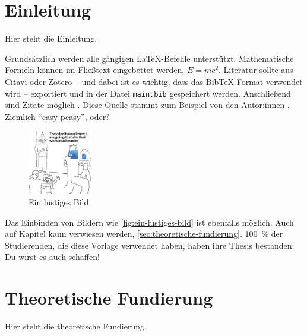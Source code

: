 \documentclass[11pt]{article}
\begin{document}
\makecover

\maketoc

\section{Einleitung}
\label{sec:einleitung}

Hier steht die Einleitung.

Grundsätzlich werden alle gängigen \LaTeX-Befehle unterstützt.
Mathematische Formeln können im Fließtext eingebettet werden, \zB \(E = mc^2\).
Literatur sollte aus Citavi oder Zotero -- und dabei ist es wichtig, dass das BibTeX-Format verwendet wird -- exportiert und in der Datei \texttt{main.bib} gespeichert werden.
Anschließend sind Zitate möglich \autocite[S.\,2--5]{haider_realization_2021}.
Diese Quelle stammt zum Beispiel von den Autor:innen \citeauthor{haider_realization_2021}.
Ziemlich \enquote{easy peasy}, oder?

\begin{figure}[h]

  \centering

  \includegraphics[width=0.25\textwidth]{images/image.jpg}

  \caption[Ein lustiges Bild]{Ein lustiges Bild \autocite{illisioun_latex_2021}}

  \label{fig:ein-lustiges-bild}

\end{figure}

Das Einbinden von Bildern wie \autoref{fig:ein-lustiges-bild} ist ebenfalls möglich.
Auch auf Kapitel kann verwiesen werden, \zB \autoref{sec:theoretische-fundierung}.
100~\% der Studierenden, die diese Vorlage verwendet haben, haben ihre Thesis bestanden;
\dash Du wirst es auch schaffen!

\clearpage

\section{Theoretische Fundierung}
\label{sec:theoretische-fundierung}

Hier steht die theoretische Fundierung.
\end{document}
